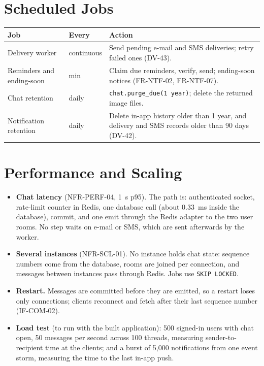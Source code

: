 \documentclass[11pt,a4paper]{article}
\newenvironment{dtable}[1]{\small\begin{longtable}{#1}}{\end{longtable}}
\begin{document}
\section{Scheduled Jobs}
\label{sec:jobs}
\begin{dtable}{@{}>{\raggedright\arraybackslash}p{3.6cm}>{\raggedright\arraybackslash}p{1.8cm}>{\raggedright\arraybackslash}p{9.8cm}@{}}
\toprule
\textbf{Job} & \textbf{Every} & \textbf{Action} \\ \midrule \endhead
Delivery worker & continuous & Send pending e-mail and SMS deliveries; retry failed ones (DV-43). \\
Reminders and ending-soon & 1 min & Claim due reminders, verify, send; ending-soon notices (FR-NTF-02, FR-NTF-07). \\
Chat retention & daily & \texttt{chat.purge\_due(1 year)}; delete the returned image files. \\
Notification retention & daily & Delete in-app history older than 1 year, and delivery and SMS records older than 90 days (DV-42). \\
\bottomrule
\end{dtable}

\section{Performance and Scaling}
\begin{itemize}[nosep]
  \item \textbf{Chat latency} (NFR-PERF-04, 1~s p95). The path is: authenticated socket, rate-limit counter in Redis, one database call (about 0.33~ms inside the database), commit, and one emit through the Redis adapter to the two user rooms. No step waits on e-mail or SMS, which are sent afterwards by the worker.
  \item \textbf{Several instances} (NFR-SCL-01). No instance holds chat state: sequence numbers come from the database, rooms are joined per connection, and messages between instances pass through Redis. Jobs use \texttt{SKIP LOCKED}.
  \item \textbf{Restart.} Messages are committed before they are emitted, so a restart loses only connections; clients reconnect and fetch after their last sequence number (IF-COM-02).
  \item \textbf{Load test} (to run with the built application): 500 signed-in users with chat open, 50 messages per second across 100 threads, measuring sender-to-recipient time at the clients; and a burst of 5{,}000 notifications from one event storm, measuring the time to the last in-app push.
\end{itemize}
\end{document}
